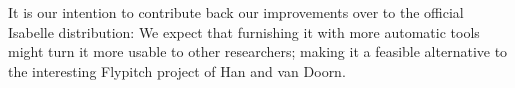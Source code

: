 It is our intention to contribute back our improvements over
 to the official Isabelle distribution: We
expect that furnishing it with more automatic tools might turn it more
usable to other researchers; making it a feasible alternative to the
interesting Flypitch project of Han and van Doorn.


